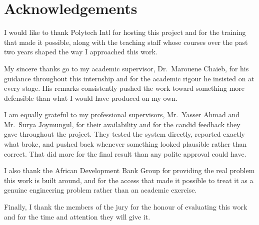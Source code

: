 \chapter*{Acknowledgements}

I would like to thank Polytech Intl for hosting this project and for the training that made it possible, along with the teaching staff whose courses over the past two years shaped the way I approached this work.

My sincere thanks go to my academic supervisor, Dr.~Marouene Chaieb, for his guidance throughout this internship and for the academic rigour he insisted on at every stage. His remarks consistently pushed the work toward something more defensible than what I would have produced on my own.

I am equally grateful to my professional supervisors, Mr.~Yasser Ahmad and Mr.~Surya Joymungul, for their availability and for the candid feedback they gave throughout the project. They tested the system directly, reported exactly what broke, and pushed back whenever something looked plausible rather than correct. That did more for the final result than any polite approval could have.

I also thank the African Development Bank Group for providing the real problem this work is built around, and for the access that made it possible to treat it as a genuine engineering problem rather than an academic exercise.

Finally, I thank the members of the jury for the honour of evaluating this work and for the time and attention they will give it.

\newpage
\thispagestyle{empty}
\mbox{}
